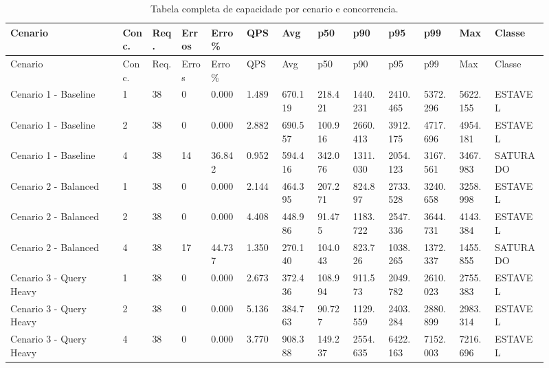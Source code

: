 \begin{landscape}
{
\scriptsize
\setlength{\tabcolsep}{4pt}
\renewcommand{\arraystretch}{1.15}
\begin{longtable}{p{0.19\linewidth}p{0.05\linewidth}p{0.05\linewidth}p{0.05\linewidth}p{0.06\linewidth}p{0.06\linewidth}p{0.06\linewidth}p{0.06\linewidth}p{0.06\linewidth}p{0.06\linewidth}p{0.06\linewidth}p{0.06\linewidth}p{0.09\linewidth}}
\caption{Tabela completa de capacidade por cenario e concorrencia.}\\
\toprule
Cenario & Conc. & Req. & Erros & Erro \% & QPS & Avg & p50 & p90 & p95 & p99 & Max & Classe \\
\midrule
\endfirsthead
\toprule
Cenario & Conc. & Req. & Erros & Erro \% & QPS & Avg & p50 & p90 & p95 & p99 & Max & Classe \\
\midrule
\endhead
Cenario 1 - Baseline & 1 & 38 & 0 & 0.000 & 1.489 & 670.119 & 218.421 & 1440.231 & 2410.465 & 5372.296 & 5622.155 & ESTAVEL \\
Cenario 1 - Baseline & 2 & 38 & 0 & 0.000 & 2.882 & 690.557 & 100.916 & 2660.413 & 3912.175 & 4717.696 & 4954.181 & ESTAVEL \\
Cenario 1 - Baseline & 4 & 38 & 14 & 36.842 & 0.952 & 594.416 & 342.076 & 1311.030 & 2054.123 & 3167.561 & 3467.983 & SATURADO \\
Cenario 2 - Balanced & 1 & 38 & 0 & 0.000 & 2.144 & 464.395 & 207.271 & 824.897 & 2733.528 & 3240.658 & 3258.998 & ESTAVEL \\
Cenario 2 - Balanced & 2 & 38 & 0 & 0.000 & 4.408 & 448.986 & 91.475 & 1183.722 & 2547.336 & 3644.731 & 4143.384 & ESTAVEL \\
Cenario 2 - Balanced & 4 & 38 & 17 & 44.737 & 1.350 & 270.140 & 104.043 & 823.726 & 1038.265 & 1372.337 & 1455.855 & SATURADO \\
Cenario 3 - Query Heavy & 1 & 38 & 0 & 0.000 & 2.673 & 372.436 & 108.994 & 911.573 & 2049.782 & 2610.023 & 2755.383 & ESTAVEL \\
Cenario 3 - Query Heavy & 2 & 38 & 0 & 0.000 & 5.136 & 384.763 & 90.727 & 1129.559 & 2403.284 & 2880.899 & 2983.314 & ESTAVEL \\
Cenario 3 - Query Heavy & 4 & 38 & 0 & 0.000 & 3.770 & 908.388 & 149.237 & 2554.635 & 6422.163 & 7152.003 & 7216.696 & ESTAVEL \\
\bottomrule
\end{longtable}
}
\end{landscape}

